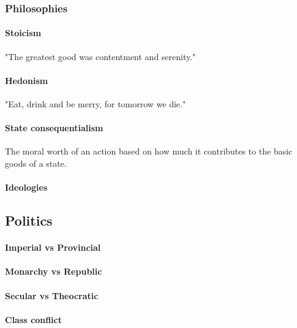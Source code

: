\begin{multicols}{2}
\subsubsection{Philosophies}
    \paragraph{Stoicism} "The greatest good was contentment and serenity."
    \paragraph{Hedonism} "Eat, drink and be merry, for tomorrow we die."
    \paragraph{State consequentialism} The moral worth of an action based on how much it contributes to the basic goods of a state.
\paragraph{Ideologies}
\subsection{Politics}
\paragraph{Imperial vs Provincial}
\paragraph{Monarchy vs Republic}
\paragraph{Secular vs Theocratic}
\paragraph{Class conflict}

\end{multicols}